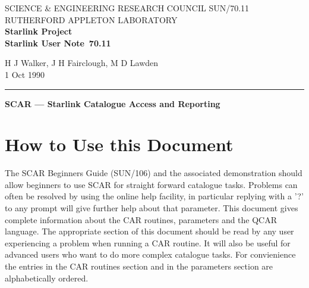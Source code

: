 \pagestyle{myheadings}

\newcommand{\stardoccategory}  {Starlink User Note}
\newcommand{\stardocinitials}  {SUN}
\newcommand{\stardocnumber}    {70.11}
\newcommand{\stardocauthors}   {H J Walker, J H Fairclough, M D Lawden}
\newcommand{\stardocdate}      {1 Oct 1990}
\newcommand{\stardoctitle}     {SCAR --- Starlink Catalogue Access and Reporting}

\newcommand{\stardocname}{\stardocinitials /\stardocnumber}
\markright{\stardocname}
\setlength{\textwidth}{160mm}
\setlength{\textheight}{240mm}
\setlength{\topmargin}{-5mm}
\setlength{\oddsidemargin}{0mm}
\setlength{\evensidemargin}{0mm}
\setlength{\parindent}{0mm}
\setlength{\parskip}{\medskipamount}
\setlength{\unitlength}{1mm}


\thispagestyle{empty}
SCIENCE \& ENGINEERING RESEARCH COUNCIL \hfill \stardocname\\
RUTHERFORD APPLETON LABORATORY\\
{\large\bf Starlink Project\\}
{\large\bf \stardoccategory\ \stardocnumber}
\begin{flushright}
\stardocauthors\\
\stardocdate
\end{flushright}
\vspace{-4mm}
\rule{\textwidth}{0.5mm}
\vspace{5mm}
\begin{center}
{\Large\bf \stardoctitle}
\end{center}
\vspace{5mm}

\setlength{\parskip}{0mm}
\tableofcontents
\setlength{\parskip}{\medskipamount}
\markright{\stardocname}
\newpage

\section {How to Use this Document}

The SCAR Beginners Guide (SUN/106) and the associated demonstration should allow
beginners to use SCAR for straight forward catalogue tasks. Problems can
often be resolved by using the online help facility, in particular replying
with a '?' to any prompt will give further help about that parameter. This 
document gives complete information about the CAR routines, parameters and
the QCAR language. The appropriate section of this document should be read 
by any user 
experiencing a problem when running a CAR routine. It will also be useful for 
advanced users who want to
do more complex catalogue tasks. For convienience the entries in the CAR
routines section and in the parameters section are alphabetically ordered. 
 
